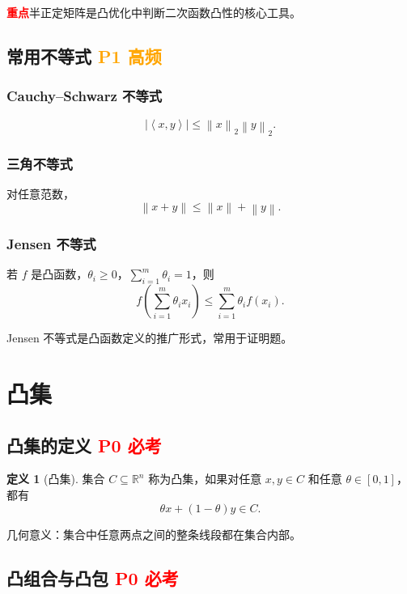 \documentclass[11pt,a4paper]{ctexart}
\newcommand{\R}{\mathbb{R}}
\newcommand{\inner}[2]{\left\langle #1,#2 \right\rangle}
\newcommand{\norm}[1]{\left\lVert #1 \right\rVert}
\newcommand{\Pzero}{\textcolor{red}{\textbf{P0 必考}}}
\newcommand{\Pone}{\textcolor{orange}{\textbf{P1 高频}}}
\newcommand{\key}{\textcolor{red}{\textbf{重点}}}
\theoremstyle{definition}
\newtheorem{definition}{定义}[section]
\theoremstyle{plain}
\theoremstyle{remark}
\begin{document}
\key{半正定矩阵是凸优化中判断二次函数凸性的核心工具。}

\subsection{常用不等式 \Pone}

\subsubsection*{Cauchy--Schwarz 不等式}

\[
    |\inner{x}{y}|
    \le
    \norm{x}_2\norm{y}_2.
\]

\subsubsection*{三角不等式}

对任意范数，
\[
    \norm{x+y}\le \norm{x}+\norm{y}.
\]

\subsubsection*{Jensen 不等式}

若 $f$ 是凸函数，$\theta_i\ge0$，$\sum_{i=1}^m\theta_i=1$，则
\[
    f\left(\sum_{i=1}^m \theta_i x_i\right)
    \le
    \sum_{i=1}^m \theta_i f(x_i).
\]

Jensen 不等式是凸函数定义的推广形式，常用于证明题。

\newpage

\section{凸集}

\subsection{凸集的定义 \Pzero}

\begin{definition}[凸集]
集合 $C\subseteq \R^n$ 称为凸集，如果对任意 $x,y\in C$ 和任意 $\theta\in[0,1]$，都有
\[
    \theta x+(1-\theta)y\in C.
\]
\end{definition}

几何意义：集合中任意两点之间的整条线段都在集合内部。

\subsection{凸组合与凸包 \Pzero}
\end{document}
